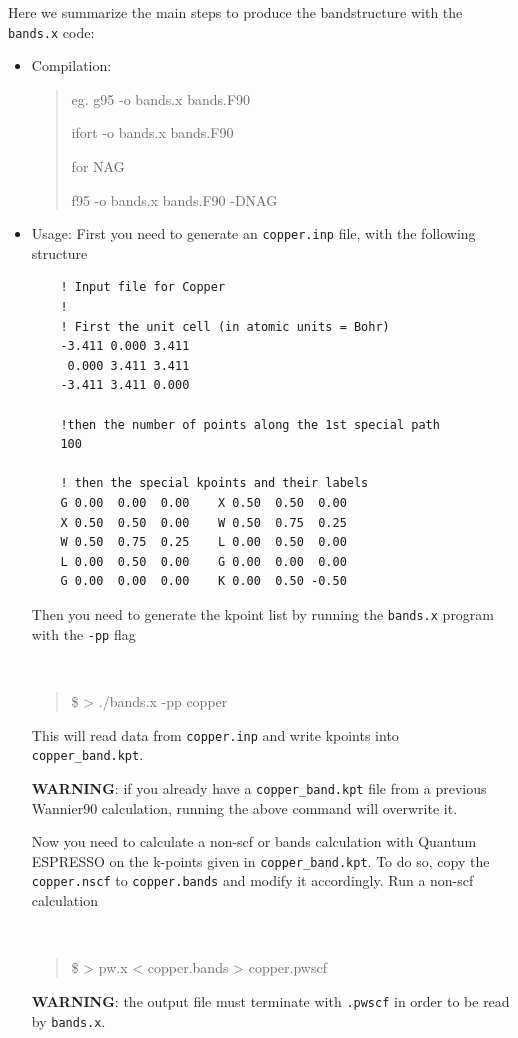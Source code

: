 \begin{tcolorbox}[colback=blue!5!white,title=BANDS.X MINITUTORIAL,float]
    {\small 
    Here we summarize the main steps to produce the bandstructure with the {\tt bands.x} code:

	\begin{itemize}
	\item Compilation: {\tt \begin{quote}
     eg. g95 -o bands.x bands.F90

         ifort -o bands.x bands.F90

    
    for NAG
     
         f95 -o bands.x bands.F90 -DNAG
         \end{quote}

    }

    \item Usage: First you need to generate an {\tt copper.inp} file, with the following structure
  
    \begin{verbatim}
    ! Input file for Copper
    !
    ! First the unit cell (in atomic units = Bohr)
    -3.411 0.000 3.411
     0.000 3.411 3.411
    -3.411 3.411 0.000
    
    !then the number of points along the 1st special path
    100

    ! then the special kpoints and their labels
    G 0.00  0.00  0.00    X 0.50  0.50  0.00
    X 0.50  0.50  0.00    W 0.50  0.75  0.25
    W 0.50  0.75  0.25    L 0.00  0.50  0.00
    L 0.00  0.50  0.00    G 0.00  0.00  0.00
    G 0.00  0.00  0.00    K 0.00  0.50 -0.50
    \end{verbatim}

    Then you need to generate the kpoint list by running the {\tt bands.x} program with the {\tt -pp} flag
    {\tt
    \begin{quote}
     \$ > ./bands.x -pp copper
    \end{quote}
    }
    This will read data from {\tt copper.inp} and write kpoints into {\tt copper\_band.kpt}. 

    {\bf WARNING}: if you already have a {\tt copper\_band.kpt} file from a previous Wannier90 calculation, running the above command will overwrite it.

    Now you need to calculate a non-scf or bands calculation with Quantum ESPRESSO on the k-points given in {\tt copper\_band.kpt}. To do so, copy the {\tt copper.nscf} to {\tt copper.bands} and modify it accordingly. Run a non-scf calculation
    {\tt
    \begin{quote}
    \$ > pw.x < copper.bands > copper.pwscf
    \end{quote} 
    }
    {\bf WARNING}: the output file must terminate with {\tt .pwscf} in order to be read by {\tt bands.x}.


\end{itemize}}
\end{tcolorbox}
